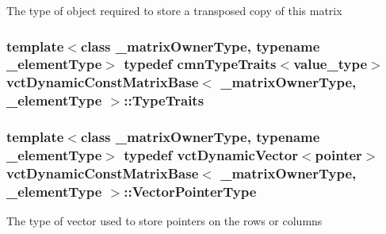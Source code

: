 The type of object required to store a transposed copy of this matrix \hypertarget{classvct_dynamic_const_matrix_base_a42f1e63cd9923069111d907ec98ac6ee}{
\subsubsection[{Type\-Traits}]{\setlength{\rightskip}{0pt plus 5cm}template$<$class \-\_\-matrix\-Owner\-Type, typename \-\_\-element\-Type$>$ typedef {\bf cmn\-Type\-Traits}$<$value\-\_\-type$>$ {\bf vct\-Dynamic\-Const\-Matrix\-Base}$<$ \-\_\-matrix\-Owner\-Type, \-\_\-element\-Type $>$\-::{\bf Type\-Traits}}}\label{classvct_dynamic_const_matrix_base_a42f1e63cd9923069111d907ec98ac6ee}
\hypertarget{classvct_dynamic_const_matrix_base_aa3fdaf7217ea2667db03af719c3371c4}{
\subsubsection[{Vector\-Pointer\-Type}]{\setlength{\rightskip}{0pt plus 5cm}template$<$class \-\_\-matrix\-Owner\-Type, typename \-\_\-element\-Type$>$ typedef {\bf vct\-Dynamic\-Vector}$<$pointer$>$ {\bf vct\-Dynamic\-Const\-Matrix\-Base}$<$ \-\_\-matrix\-Owner\-Type, \-\_\-element\-Type $>$\-::{\bf Vector\-Pointer\-Type}}}\label{classvct_dynamic_const_matrix_base_aa3fdaf7217ea2667db03af719c3371c4}
The type of vector used to store pointers on the rows or columns 

